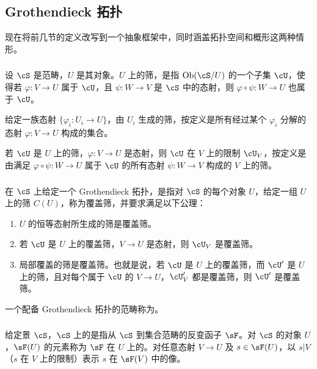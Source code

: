 \subsection{Grothendieck 拓扑}\label{I:1-6}
现在将前几节的定义改写到一个抽象框架中，同时涵盖拓扑空间和概形这两种情形。

\subsubsection{}\label{I:1-6-1}
设 $\cS$ 是范畴，$U$ 是其对象。$U$ 上的筛，是指 $\ob(\cS/U)$ 的一个子集 $\cU$，使得若 $\varphi:V\to U$ 属于 $\cU$，且 $\psi:W\to V$ 是 $\cS$ 中的态射，则 $\varphi\circ\psi:W\to U$ 也属于 $\cU$。

给定一族态射 $\{\varphi_i:U_i\to U\}$，由 $U_i$ 生成的筛，按定义是所有经过某个 $\varphi_i$ 分解的态射 $\varphi:V\to U$ 构成的集合。

若 $\cU$ 是 $U$ 上的筛，$\varphi:V\to U$ 是态射，则 $\cU$ 在 $V$ 上的限制 $\cU_V$，按定义是由满足 $\varphi\circ\psi:W\to U$ 属于 $\cU$ 的所有态射 $\psi:W\to V$ 构成的 $V$ 上的筛。

\subsubsection{}\label{I:1-6-2}
在 $\cS$ 上给定一个 Grothendieck 拓扑，是指对 $\cS$ 的每个对象 $U$，给定一组 $U$ 上的筛 $C(U)$，称为覆盖筛，并要求满足以下公理：
\begin{enumerate}[\indent a)]
\item $U$ 的恒等态射所生成的筛是覆盖筛。
\item 若 $\cU$ 是 $U$ 上的覆盖筛，$V\to U$ 是态射，则 $\cU_V$ 是覆盖筛。
\item 局部覆盖的筛是覆盖筛。也就是说，若 $\cU$ 是 $U$ 上的覆盖筛，而 $\cU'$ 是 $U$ 上的筛，且对每个属于 $\cU$ 的 $V\to U$，$\cU'_V$ 都是覆盖筛，则 $\cU'$ 是覆盖筛。
\end{enumerate}

一个配备 Grothendieck 拓扑的范畴称为。

\subsubsection{}\label{I:1-6-3}
给定景 $\cS$，$\cS$ 上的是指从 $\cS$ 到集合范畴的反变函子 $\sF$。对 $\cS$ 的对象 $U$，$\sF(U)$ 的元素称为 $\sF$ 在 $U$ 上的。对任意态射 $V\to U$ 及 $s\in\sF(U)$，以 $s|V$（$s$ 在 $V$ 上的限制）表示 $s$ 在 $\sF(V)$ 中的像。

